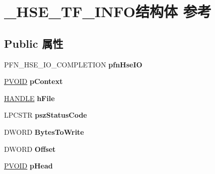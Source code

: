 \hypertarget{struct___h_s_e___t_f___i_n_f_o}{}\section{\+\_\+\+H\+S\+E\+\_\+\+T\+F\+\_\+\+I\+N\+F\+O结构体 参考}
\label{struct___h_s_e___t_f___i_n_f_o}
\subsection*{Public 属性}
\begin{DoxyCompactItemize}
\item 
\mbox{\label{struct___h_s_e___t_f___i_n_f_o_a8b91f31429b2893e3c5185f860c1be48}} 
P\+F\+N\+\_\+\+H\+S\+E\+\_\+\+I\+O\+\_\+\+C\+O\+M\+P\+L\+E\+T\+I\+ON {\bfseries pfn\+Hse\+IO}
\item 
\mbox{\label{struct___h_s_e___t_f___i_n_f_o_a2234480c3d8288d16604704d12c91a36}} 
\hyperlink{interfacevoid}{P\+V\+O\+ID} {\bfseries p\+Context}
\item 
\mbox{\label{struct___h_s_e___t_f___i_n_f_o_aeb6484852609f5827b77f6b46d226d59}} 
\hyperlink{interfacevoid}{H\+A\+N\+D\+LE} {\bfseries h\+File}
\item 
\mbox{\label{struct___h_s_e___t_f___i_n_f_o_a519ac2894e0f14fb4bc930d0b2ccd643}} 
L\+P\+C\+S\+TR {\bfseries psz\+Status\+Code}
\item 
\mbox{\label{struct___h_s_e___t_f___i_n_f_o_abb79687f85289aad5b435c1818182964}} 
D\+W\+O\+RD {\bfseries Bytes\+To\+Write}
\item 
\mbox{\label{struct___h_s_e___t_f___i_n_f_o_a2d369753b22dd221a2fe6b370cef96be}} 
D\+W\+O\+RD {\bfseries Offset}
\item 
\mbox{\label{struct___h_s_e___t_f___i_n_f_o_a54be704f7fb234710acc5d495d154b39}} 
\hyperlink{interfacevoid}{P\+V\+O\+ID} {\bfseries p\+Head}
\item 
\mbox{\label{struct___h_s_e___t_f___i_n_f_o_a217a4c13cccc19d9760098fdf1342821}} 

\end{DoxyCompactItemize}
